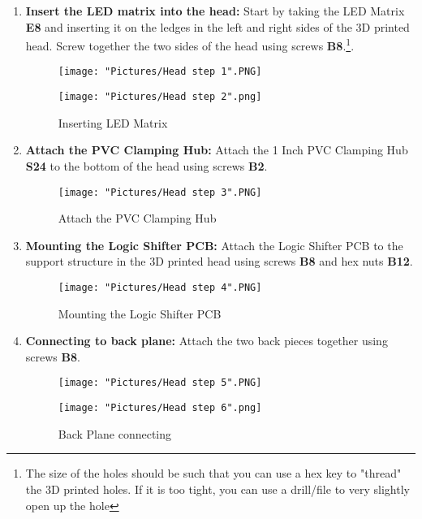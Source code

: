 \documentclass[12pt]{article}
\begin{document}
\begin{enumerate}

	\item \textbf{Insert the LED matrix into the head:} Start by taking the LED Matrix \textbf{E8} and inserting it on the ledges in the left and right sides of the 3D printed head. Screw together the two sides of the head using screws \textbf{B8}.\footnote{The size of the holes should be such that you can use a hex key to "thread" the 3D printed holes. If it is too tight, you can use a drill/file to very slightly open up the hole}.


\begin{figure}[H]
	\centering
  	\begin{minipage}[b]{0.45\textwidth}
		\texttt{[image: "Pictures/Head step 1".PNG]}
  	\end{minipage}
  	\hfill
  	\begin{minipage}[b]{0.45\textwidth}
    		\texttt{[image: "Pictures/Head step 2".png]}
  	\end{minipage}
  	\caption{Inserting LED Matrix}
  	\label{LED}
\end{figure}

	\item \textbf{Attach the PVC  Clamping Hub:} Attach the 1 Inch PVC Clamping Hub \textbf{S24} to the bottom of the head using screws \textbf{B2}. 

\begin{figure}[H]
	\centering
	\texttt{[image: "Pictures/Head step 3".PNG]}
	\caption{Attach the PVC Clamping Hub}
\end{figure}

	\item \textbf{Mounting the Logic Shifter PCB:} Attach the Logic Shifter PCB to the support structure in the 3D printed head using screws \textbf{B8} and hex nuts \textbf{B12}. 

\begin{figure}[H]
	\centering
	\texttt{[image: "Pictures/Head step 4".PNG]}
	\caption{Mounting the Logic Shifter PCB}
\end{figure}

	\item \textbf{Connecting to back plane:} Attach the two back pieces together using screws \textbf{B8}. 

\begin{figure}[H]
	\centering
  	\begin{minipage}[b]{0.45\textwidth}
		\texttt{[image: "Pictures/Head step 5".PNG]}
  	\end{minipage}
  	\hfill
  	\begin{minipage}[b]{0.45\textwidth}
    		\texttt{[image: "Pictures/Head step 6".png]}
  	\end{minipage}
  	\caption{Back Plane connecting}
  	\label{back}
\end{figure}


\end{enumerate}
\end{document}
